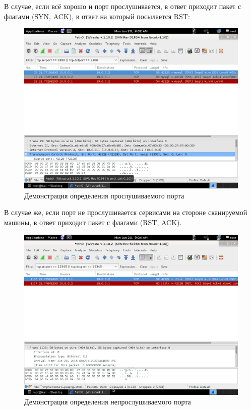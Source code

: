\documentclass[a4paper]{article}
\begin{document}
В случае, если всё хорошо и порт прослушивается, в ответ приходит пакет с флагами (SYN, ACK), в ответ на который посылается RST:

\begin{figure}[H]
	\begin{center}
		\includegraphics[scale=0.5]{pics/good_tcp.png}
		\caption{Демонстрация определения прослушиваемого порта} 
		\label{pic:pic_name}
	\end{center}
\end{figure}

В случае же, если порт не прослушивается сервисами на стороне сканируемой машины, в ответ приходит пакет с флагами (RST, ACK).

\begin{figure}[H]
	\begin{center}
		\includegraphics[scale=0.5]{pics/bad_tcp.png}
		\caption{Демонстрация определения непрослушиваемого порта} 
		\label{pic:pic_name}
	\end{center}
\end{figure}
\end{document}
